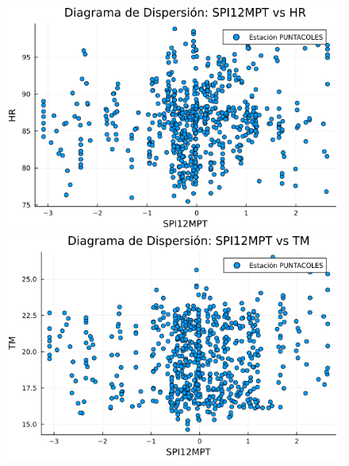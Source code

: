 \begin{figure}[htbp]
\vspace{0.5cm}  %

\begin{minipage}{0.32\textwidth}
    \centering
    \includegraphics[width=\linewidth]{Capitulos/Scaterplot/PUNTACOLES_SPI12MPT_vs_HR.png}
\end{minipage}\hfill
\begin{minipage}{0.32\textwidth}
    \centering
    \includegraphics[width=\linewidth]{Capitulos/Scaterplot/PUNTACOLES_SPI12MPT_vs_TM.png}
\end{minipage}\hfill
\begin{minipage}{0.32\textwidth}
    \centering

\end{minipage}
\end{figure}
